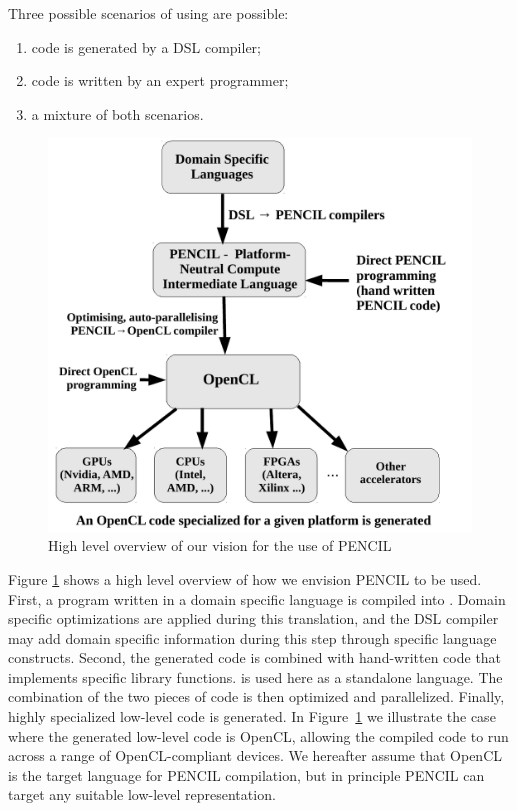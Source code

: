 Three possible scenarios of using \pencil are possible:
\begin{enumerate}
\item \pencil code is generated by a DSL compiler;
\item \pencil code is written by an expert programmer;
\item a mixture of both scenarios.
\end{enumerate}

\begin{figure}[ht]
{
 \centering
 \includegraphics[scale=0.65]{./figures/CARPHighLevelOverview.pdf}
 \caption{High level overview of our vision for the use of PENCIL}
 \label{fig-pencil-high-level-picture}
} 
\end{figure}

Figure \ref{fig-pencil-high-level-picture} shows a high level
overview of how we envision PENCIL to be used.
First, a program written in a domain
specific language is compiled into \pencil.  Domain specific
optimizations are applied during this translation, and the DSL compiler may
add domain specific information during this step through specific \pencil
language
constructs.  Second, the generated \pencil code is combined with
hand-written \pencil code that implements specific library
functions.  \pencil is used here as a standalone language.  The
combination of the two pieces of code is then optimized and
parallelized.  Finally, 
highly specialized low-level code is generated.
In Figure~\ref{fig-pencil-high-level-picture} we 
illustrate the case where the generated low-level code is OpenCL, 
allowing the compiled code to run across a range of OpenCL-compliant 
devices.  We hereafter assume that OpenCL is the target language for 
PENCIL compilation, but in principle PENCIL can target any suitable 
low-level representation.

